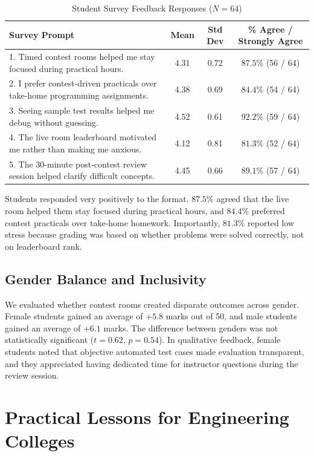 \documentclass[12pt,a4paper]{article}
\begin{document}
\begin{table}[!htbp]
\centering
\small
\caption{Student Survey Feedback Responses ($N = 64$)}
\label{tab:survey_results}
\begin{tabularx}{\linewidth}{|X|c|c|c|}
\hline
\textbf{Survey Prompt} & \textbf{Mean} & \textbf{Std Dev} & \textbf{\% Agree / Strongly Agree} \\
\hline
1. Timed contest rooms helped me stay focused during practical hours. & 4.31 & 0.72 & $87.5\%$ (56 / 64) \\
\hline
2. I prefer contest-driven practicals over take-home programming assignments. & 4.38 & 0.69 & $84.4\%$ (54 / 64) \\
\hline
3. Seeing sample test results helped me debug without guessing. & 4.52 & 0.61 & $92.2\%$ (59 / 64) \\
\hline
4. The live room leaderboard motivated me rather than making me anxious. & 4.12 & 0.81 & $81.3\%$ (52 / 64) \\
\hline
5. The 30-minute post-contest review session helped clarify difficult concepts. & 4.45 & 0.66 & $89.1\%$ (57 / 64) \\
\hline
\end{tabularx}
\end{table}

Students responded very positively to the format. $87.5\%$ agreed that the live room helped them stay focused during practical hours, and $84.4\%$ preferred contest practicals over take-home homework. Importantly, $81.3\%$ reported low stress because grading was based on whether problems were solved correctly, not on leaderboard rank.

\subsection{Gender Balance and Inclusivity}
We evaluated whether contest rooms created disparate outcomes across gender. Female students gained an average of $+5.8$ marks out of 50, and male students gained an average of $+6.1$ marks. The difference between genders was not statistically significant ($t = 0.62$, $p = 0.54$). In qualitative feedback, female students noted that objective automated test cases made evaluation transparent, and they appreciated having dedicated time for instructor questions during the review session.

\section{Practical Lessons for Engineering Colleges}
\label{sec:lessons}
\end{document}
